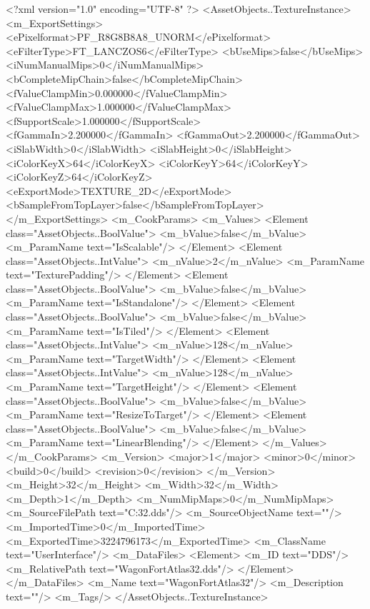 <?xml version="1.0" encoding="UTF-8" ?>
<AssetObjects..TextureInstance>
	<m_ExportSettings>
		<ePixelformat>PF_R8G8B8A8_UNORM</ePixelformat>
		<eFilterType>FT_LANCZOS6</eFilterType>
		<bUseMips>false</bUseMips>
		<iNumManualMips>0</iNumManualMips>
		<bCompleteMipChain>false</bCompleteMipChain>
		<fValueClampMin>0.000000</fValueClampMin>
		<fValueClampMax>1.000000</fValueClampMax>
		<fSupportScale>1.000000</fSupportScale>
		<fGammaIn>2.200000</fGammaIn>
		<fGammaOut>2.200000</fGammaOut>
		<iSlabWidth>0</iSlabWidth>
		<iSlabHeight>0</iSlabHeight>
		<iColorKeyX>64</iColorKeyX>
		<iColorKeyY>64</iColorKeyY>
		<iColorKeyZ>64</iColorKeyZ>
		<eExportMode>TEXTURE_2D</eExportMode>
		<bSampleFromTopLayer>false</bSampleFromTopLayer>
	</m_ExportSettings>
	<m_CookParams>
		<m_Values>
			<Element class="AssetObjects..BoolValue">
				<m_bValue>false</m_bValue>
				<m_ParamName text="IsScalable"/>
			</Element>
			<Element class="AssetObjects..IntValue">
				<m_nValue>2</m_nValue>
				<m_ParamName text="TexturePadding"/>
			</Element>
			<Element class="AssetObjects..BoolValue">
				<m_bValue>false</m_bValue>
				<m_ParamName text="IsStandalone"/>
			</Element>
			<Element class="AssetObjects..BoolValue">
				<m_bValue>false</m_bValue>
				<m_ParamName text="IsTiled"/>
			</Element>
			<Element class="AssetObjects..IntValue">
				<m_nValue>128</m_nValue>
				<m_ParamName text="TargetWidth"/>
			</Element>
			<Element class="AssetObjects..IntValue">
				<m_nValue>128</m_nValue>
				<m_ParamName text="TargetHeight"/>
			</Element>
			<Element class="AssetObjects..BoolValue">
				<m_bValue>false</m_bValue>
				<m_ParamName text="ResizeToTarget"/>
			</Element>
			<Element class="AssetObjects..BoolValue">
				<m_bValue>false</m_bValue>
				<m_ParamName text="LinearBlending"/>
			</Element>
		</m_Values>
	</m_CookParams>
	<m_Version>
		<major>1</major>
		<minor>0</minor>
		<build>0</build>
		<revision>0</revision>
	</m_Version>
	<m_Height>32</m_Height>
	<m_Width>32</m_Width>
	<m_Depth>1</m_Depth>
	<m_NumMipMaps>0</m_NumMipMaps>
	<m_SourceFilePath text="C:\Users\aaron\Downloads\WagonFortAtlas32.dds"/>
	<m_SourceObjectName text=""/>
	<m_ImportedTime>0</m_ImportedTime>
	<m_ExportedTime>3224796173</m_ExportedTime>
	<m_ClassName text="UserInterface"/>
	<m_DataFiles>
		<Element>
			<m_ID text="DDS"/>
			<m_RelativePath text="WagonFortAtlas32.dds"/>
		</Element>
	</m_DataFiles>
	<m_Name text="WagonFortAtlas32"/>
	<m_Description text=""/>
	<m_Tags/>
</AssetObjects..TextureInstance>


